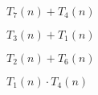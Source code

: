 \begin{prob}
\begin{subprobset}
        \begin{subprob}
            $T_7(n) + T_4(n)$

            \begin{soln}
            
            \end{soln}
        \end{subprob}

        \begin{subprob}
            $T_3(n) + T_1(n)$

            \begin{soln}
            
            \end{soln}
        \end{subprob}

        \begin{subprob}
            $T_2(n) + T_6(n)$

            \begin{soln}
            
            \end{soln}
        \end{subprob}

        \begin{subprob}
            $T_1(n) \cdot T_4(n)$

            \begin{soln}
            
            \end{soln}

        \end{subprob}

    \end{subprobset}

\end{prob}


